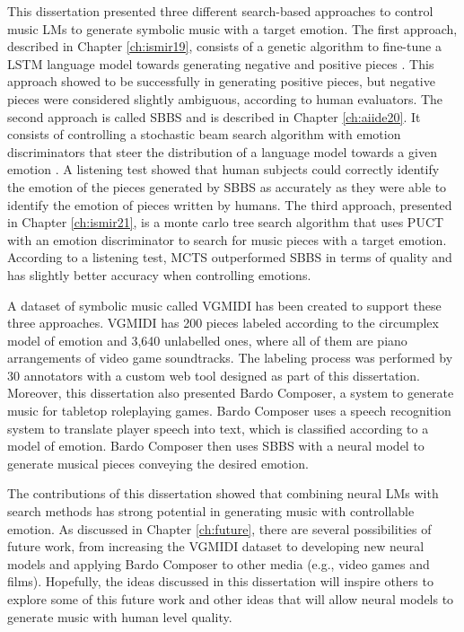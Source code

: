 This dissertation presented three different search-based approaches to control music LMs to generate symbolic music with a target emotion. The first approach, described in Chapter \ref{ch:ismir19}, consists of a genetic algorithm to fine-tune a LSTM language model towards generating negative and positive pieces \cite{ferreira_2019}. This approach showed to be successfully in generating positive pieces, but negative pieces were considered slightly ambiguous, according to human evaluators. The second approach is called SBBS and is described in Chapter \ref{ch:aiide20}. It consists of controlling a stochastic beam search algorithm with emotion discriminators that steer the distribution of a language model towards a given emotion \cite{ferreira2020computer}.
A listening test showed that human subjects could correctly identify the emotion of the pieces generated by SBBS as accurately as they were able to identify the emotion of pieces written by humans. The third approach, presented in Chapter \ref{ch:ismir21}, is a monte carlo tree search algorithm that uses PUCT with an emotion discriminator to search for music pieces with a target emotion. According to a listening test, MCTS outperformed SBBS in terms of quality and has slightly better accuracy when controlling emotions.

A dataset of symbolic music called VGMIDI has been created to support these three approaches. VGMIDI has 200  pieces labeled according to the circumplex model of emotion \cite{russell1980circumplex} and 3,640 unlabelled ones, where all of them are piano arrangements of video game soundtracks. The labeling process was performed by 30 annotators with a custom web tool designed as part of this dissertation. Moreover, this dissertation also presented Bardo Composer, a system to generate music for tabletop roleplaying games. Bardo Composer uses a speech recognition system to translate player speech into text, which is classified according to a model of emotion. Bardo Composer then uses SBBS with a neural model to generate musical pieces conveying the desired emotion.

The contributions of this dissertation showed that combining neural LMs with search methods has strong potential in generating music with controllable emotion. As discussed in Chapter \ref{ch:future}, there are several possibilities of future work, from increasing the VGMIDI dataset to developing new neural models and applying Bardo Composer to other media (e.g., video games and films). Hopefully, the ideas discussed in this dissertation will inspire others to explore some of this future work and other ideas that will allow neural models to generate music with human level quality.
